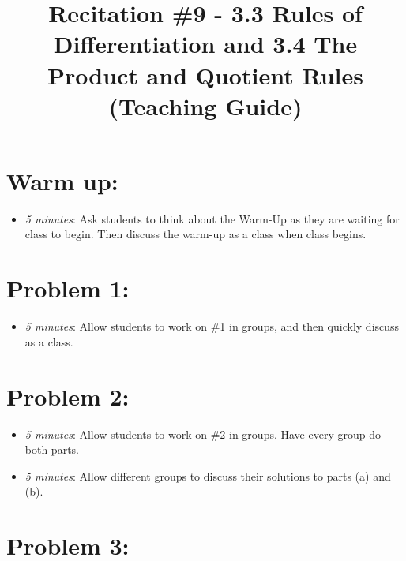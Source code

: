 \documentclass[handout,nooutcomes]{ximera}
\title{Recitation \#9 - 3.3 Rules of Differentiation and 3.4 The Product and Quotient Rules (Teaching Guide)}
\begin{document}
\begin{abstract}		\end{abstract}
\maketitle


\section*{Warm up:} 
	
	\begin{itemize}
	
	\item  \emph{5 minutes}:  Ask students to think about the Warm-Up as they are waiting for class to begin.  Then discuss the warm-up as a class when class begins.
	
	
	
	\end{itemize}


\section*{Problem 1:}

	\begin{itemize}
	
	\item  \emph{5 minutes}:  Allow students to work on \#1 in groups, and then quickly discuss as a class.  
	
	\end{itemize}



\section*{Problem 2:}

	\begin{itemize}
	
	\item  \emph{5 minutes}:  Allow students to work on \#2 in groups.  Have every group do both parts.
		
	\item  \emph{5 minutes}:  Allow different groups to discuss their solutions to parts (a) and (b).  
			
	\end{itemize}
	
	
	
\section*{Problem 3:}
\end{document}
